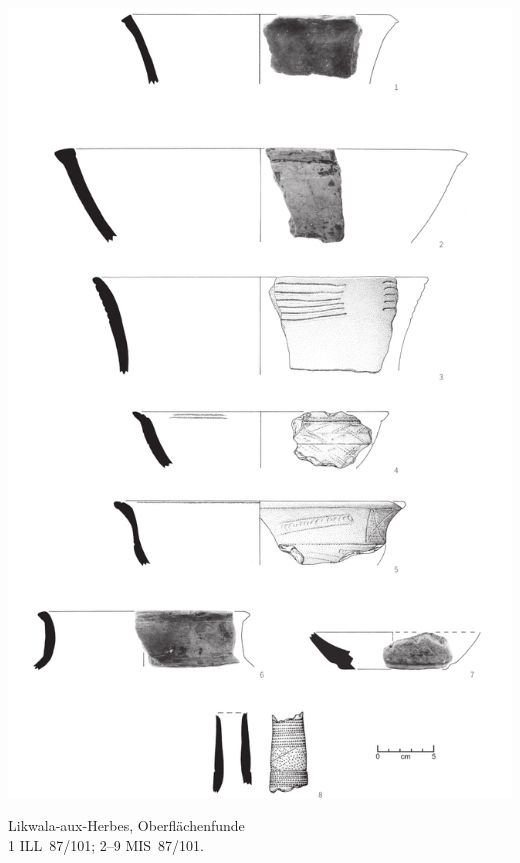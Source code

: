 \begin{pl}[H]
	\includegraphics{plt/Taf72.pdf}
	\vspace{.75em}\caption{Likwala-aux-Herbes, Oberflächenfunde \\ 1 ILL~87/101; 2--9 MIS~87/101.}
	\label{pl:72}
\end{pl}

